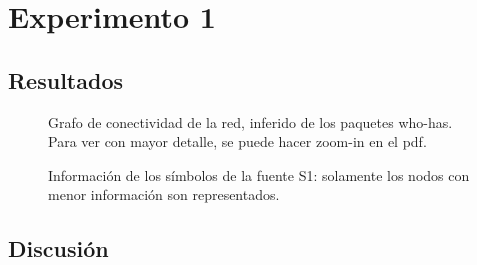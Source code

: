
\section{Experimento 1}

\subsection{Resultados}

\begin{figure}[H]
  \centering
  \caption{\normalfont }
\end{figure}

\begin{figure}[H]
  \centering
  \caption{  \normalfont Grafo de conectividad de la red, inferido de los paquetes who-has. Para ver con mayor detalle, se puede hacer zoom-in en el pdf. }
\end{figure}

\begin{figure}[H]
  \centering
  \caption{ \normalfont Información de los símbolos de la fuente S1: solamente los nodos con menor información son representados.}
\end{figure}

\subsection{Discusión}


